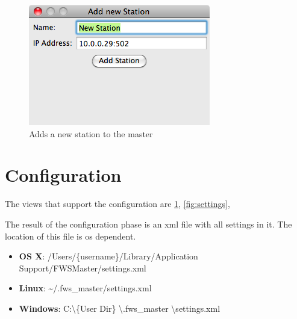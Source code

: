 \begin{figure}[ht]
    \centering
    \includegraphics[width=0.6\linewidth]{master/add.png}
    \caption{Adds a new station to the master}
    \label{fig:add}
\end{figure}


%

\section{Configuration} %
\label{sec:configuration} 
The views that support the configuration are \ref{fig:add}, \ref{fig:settings}, %

The result of the configuration phase is an xml file with all settings in it. The location of this file is os dependent. 
\begin{itemize}
    \item \textbf{OS X}: /Users/\{username\}/Library/Application Support/FWSMaster/settings.xml
    \item \textbf{Linux}: \textasciitilde /.fws\_master/settings.xml
    \item \textbf{Windows}: C:\textbackslash \{User Dir\} \textbackslash .fws\_master \textbackslash settings.xml
\end{itemize}

